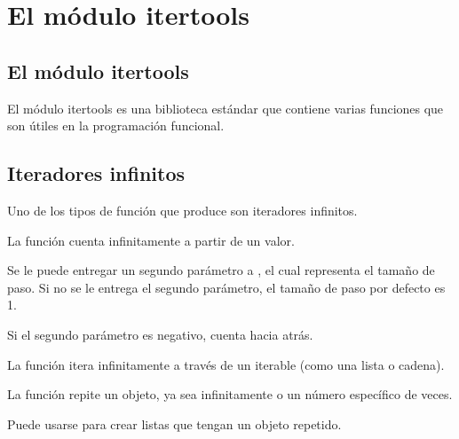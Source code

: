 \chapter{El módulo itertools}

\section{El módulo itertools}

El módulo itertools es una biblioteca estándar que contiene varias funciones que son útiles en la programación funcional.


\section{Iteradores infinitos}

Uno de los tipos de función que produce son iteradores infinitos.

La función  cuenta infinitamente a partir de un valor.


Se le puede entregar un segundo parámetro a , el cual representa el tamaño de paso.
Si no se le entrega el segundo parámetro, el tamaño de paso por defecto es 1.


Si el segundo parámetro es negativo, cuenta hacia atrás.


La función itera infinitamente a través de un iterable (como una lista o cadena).


La función  repite un objeto, ya sea infinitamente o un número específico de veces.


Puede usarse para crear listas que tengan un objeto repetido.


